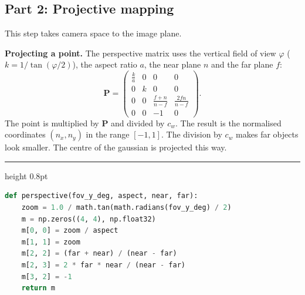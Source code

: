 \documentclass[9pt,twocolumn,a4paper]{extarticle}
\newenvironment{codebox}{\par\vspace{5pt}\noindent\begin{minipage}{\columnwidth}\hrule height 0.8pt\vspace{2pt}}{\end{minipage}\par\vspace{5pt}\noindent\ignorespaces}
\newcommand{\code}[1]{\texttt{#1}}
\begin{document}
\subsection{Part 2: Projective mapping}
\label{sec:ewa}
This step takes camera space to the image plane.

\textbf{Projecting a point.} The perspective matrix uses the vertical field of view $\varphi$ ($k=1/\tan(\varphi/2)$), the aspect ratio $a$, the near plane $n$ and the far plane $f$:
\begin{equation}
\mathbf{P}=\begin{pmatrix}
\frac{k}{a}&0&0&0\\0&k&0&0\\
0&0&\frac{f+n}{n-f}&\frac{2fn}{n-f}\\0&0&-1&0\end{pmatrix}.
\label{eq:proj}
\end{equation}
The point is multiplied by $\mathbf{P}$ and divided by $c_w$. The result is the normalised coordinates $(n_x,n_y)$ in the range $[-1,1]$. The division by $c_w$ makes far objects look smaller. The centre of the gaussian is projected this way.

\begin{codebox}
\begin{lstlisting}[language=Python,caption={\code{core/math3d.py}, \code{perspective}: projection matrix $\mathbf{P}$},label={lst:persp}]
def perspective(fov_y_deg, aspect, near, far):
    zoom = 1.0 / math.tan(math.radians(fov_y_deg) / 2)
    m = np.zeros((4, 4), np.float32)
    m[0, 0] = zoom / aspect
    m[1, 1] = zoom
    m[2, 2] = (far + near) / (near - far)
    m[2, 3] = 2 * far * near / (near - far)
    m[3, 2] = -1
    return m
\end{lstlisting}
\end{codebox}
\end{document}
